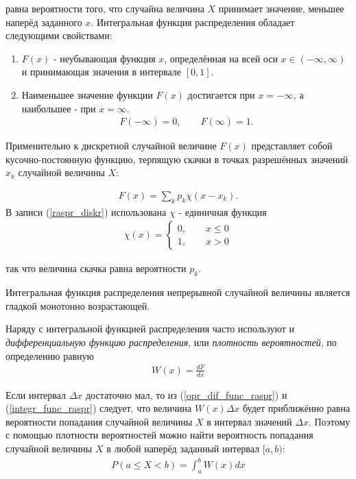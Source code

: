 равна вероятности того, что случайна величина $X$ принимает значение, меньшее наперёд заданного $x$. Интегральная функция распределения обладает следующими свойствами:
\begin{enumerate}
	\item $F(x)$ - неубывающая функция $x$, определённая на всей оси $x\in(-\infty,\infty)$ и принимающая значения в интервале $[0, 1]$.
	\item {Наименьшее значение функции $F(x)$ достигается при $x = -\infty$, а наибольшее - при $x = \infty$.
	\begin{align}
		F(-\infty)=0, \qquad F(\infty) = 1.
	\end{align}
	}
\end{enumerate}

Применительно к дискретной случайной величине $F(x)$ представляет собой кусочно-постоянную функцию, терпящую скачки в точках разрешённых значений $x_k$ случайной величины $X$:

\begin{align} \label{raspr_diskr}
	F(x) = \sum_{k}{p_k \chi (x - x_k).}
\end{align}
В записи (\ref{raspr_diskr}) использована $\chi$ - единичная функция 
\begin{align}
	\chi(x) = \left \{
	\begin{aligned}
		0, \qquad x \leq 0 \\
		1, \qquad x > 0
	\end{aligned} \right.
\end{align}

так что величина скачка равна вероятности $p_k$.

Интегральная функция распределения непрерывной случайной величины является гладкой монотонно возрастающей.

Наряду с интегральной функцией распределения часто используют и \textit{дифференциальную функцию распределения}, или \textit{плотность вероятностей}, по определению равную 
\begin{align} \label{opr_dif_func_raspr}
	W(x) = \frac{dF}{dx}
\end{align}

 Если интервал $\Delta x$ достаточно мал, то из (\ref{opr_dif_func_raspr}) и (\ref{integr_func_raspr})  следует, что величина $W(x)\Delta x$ будет приближённо равна вероятности попадания случайной величины $X$ в интервал значений $\Delta x$. Поэтому с помощью плотности вероятностей можно найти вероятность попадания случайной величины $X$ в любой наперёд заданный интервал $[a, b)$:
 \begin{align}
 	P(a \leq X < b) = \int_{a}^{b}{W(x)dx}
 \end{align}
 
